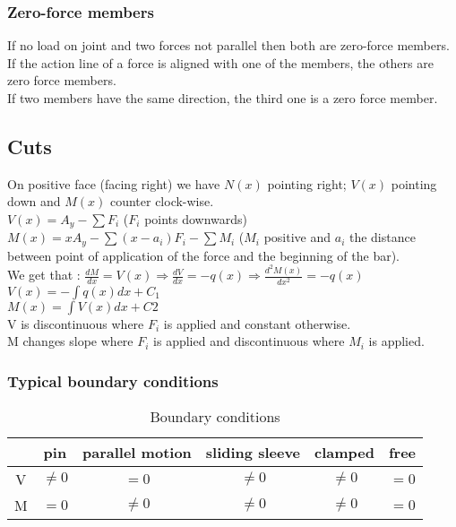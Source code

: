 \documentclass[../main.tex]{subfiles}
\begin{document}
\subsubsection{Zero-force members}
If no load on joint and two forces not parallel then both are zero-force members.\\
If the action line of a force is aligned with one of the members, the others are zero force members.\\
If two members have the same direction, the third one is a zero force member.\\




\subsection{Cuts}
On positive face (facing right)  we have $N(x)$ pointing right; $V(x)$ pointing down and $M(x)$ counter clock-wise.\\
$V(x) = A_y - \sum F_i$ ($F_i$ points downwards)\\
$M(x) = xA_y - \sum (x-a_i)F_i - \sum M_i$ ($M_i$ positive and $a_i$ the distance between point of application of the force and the beginning of the bar).\\

We get that : $\frac{dM}{dx} = V(x) \Rightarrow \frac{dV}{dx} = -q(x) \Rightarrow \frac{d^2M(x)}{dx^2} = -q(x)$\\
$V(x) = -\int q(x)dx + C_1$ \\
$M(x) = \int V(x)dx + C2$\\

V is discontinuous where $F_i$ is applied and constant otherwise.\\
M changes slope where $F_i$ is applied and discontinuous where $M_i$ is applied.\\

\subsubsection{Typical boundary conditions}
\begin{table}[hbt!]
    \centering
    \begin{tabular}{c|c|c|c|c|c}
         & pin & parallel motion & sliding sleeve & clamped & free \\
        \hline 
        V & $\neq 0$ & $=0$ & $\neq 0$&$\neq 0$&$=0$ \\
        \hline
        M & $=0$&$\neq 0$&$\neq 0$&$\neq0$&$=0$\\
    \end{tabular}
    \caption{Boundary conditions}
    
\end{table}
\end{document}
